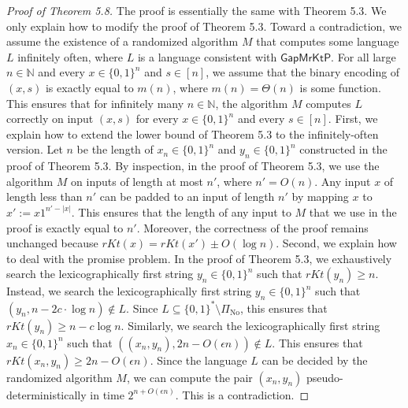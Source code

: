 \documentclass[10pt,a4paper]{article}
\begin{document}
\begin{proof}[Proof of Theorem 5.8]
The proof is essentially the same with Theorem 5.3. We only explain how to modify the proof of Theorem 5.3.
Toward a contradiction, we assume the existence of a randomized algorithm $M$ that computes some language $L$ infinitely often, where $L$ is a language consistent with $\mathsf{GapMrKtP}$. For all large $n\in\mathbb N$ and every $x\in\{0,1\}^n$ and $s\in[n]$, we assume that the binary encoding of $(x,s)$ is exactly equal to $m(n)$, where $m(n)=\Theta(n)$ is some function. This ensures that for infinitely many $n\in\mathbb N$, the algorithm $M$ computes $L$ correctly on input $(x,s)$ for every $x\in\{0,1\}^n$ and every $s\in[n]$.
First, we explain how to extend the lower bound of Theorem 5.3 to the infinitely-often version. Let $n$ be the length of $x_n\in\{0,1\}^n$ and $y_n\in\{0,1\}^n$ constructed in the proof of Theorem 5.3. By inspection, in the proof of Theorem 5.3, we use the algorithm $M$ on inputs of length at most $n'$, where $n'=O(n)$. Any input $x$ of length less than $n'$ can be padded to an input of length $n'$ by mapping $x$ to $x':=x1^{n'-|x|}$. This ensures that the length of any input to $M$ that we use in the proof is exactly equal to $n'$. Moreover, the correctness of the proof remains unchanged because $rKt(x)=rKt(x')\pm O(\log n)$.
Second, we explain how to deal with the promise problem. In the proof of Theorem 5.3, we exhaustively search the lexicographically first string $y_n\in\{0,1\}^n$ such that $rKt(y_n)\geq n$. Instead, we search the lexicographically first string $y_n\in\{0,1\}^n$ such that $(y_n,n-2c\cdot\log n)\notin L$. Since $L\subseteq\{0,1\}^*\setminus\Pi_{\mathrm{No}}$, this ensures that $rKt(y_n)\geq n-c\log n$. Similarly, we search the lexicographically first string $x_n\in\{0,1\}^n$ such that $((x_n,y_n),2n-O(\epsilon n))\notin L$. This ensures that $rKt(x_n,y_n)\geq2n-O(\epsilon n)$. Since the language $L$ can be decided by the randomized algorithm $M$, we can compute the pair $(x_n,y_n)$ pseudo-deterministically in time $2^{n+O(\epsilon n)}$. This is a contradiction.
\end{proof}
\end{document}
